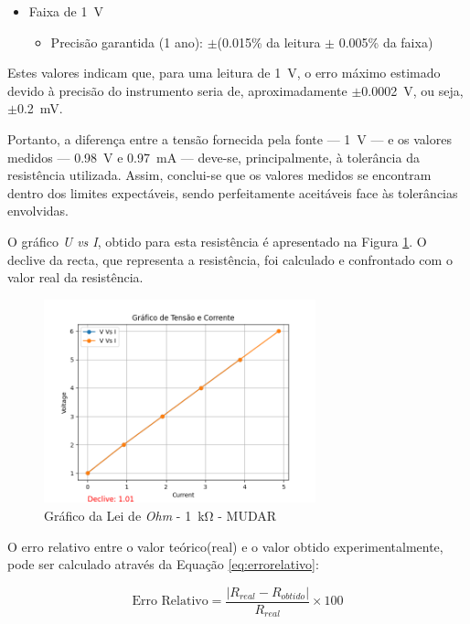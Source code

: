 \begin{itemize}
	\item Faixa de \SI{1}{\volt}
	\begin{itemize}
		\item Precisão garantida (1 ano): $\pm$(0.015\% da leitura $\pm$ 0.005\% da faixa)
	\end{itemize}
\end{itemize}

Estes valores indicam que, para uma leitura de \SI{1}{\volt}, o erro máximo estimado devido à precisão do instrumento seria de, aproximadamente $\pm$\SI{0.0002}{\volt}, ou seja, $\pm$\SI{0.2}{\milli\volt}.

Portanto, a diferença entre a tensão fornecida pela fonte — \SI{1}{\volt} — e os valores medidos — \SI{0.98}{\volt} e \SI{0.97}{\milli\ampere} — deve-se, principalmente, à tolerância da resistência utilizada. Assim, conclui-se que os valores medidos se encontram dentro dos limites expectáveis, sendo perfeitamente aceitáveis face às tolerâncias envolvidas.

O gráfico \textit{U vs I}, obtido para esta resistência é apresentado na Figura \ref{fig:grafico_LaRE_1k}. O declive da recta, que representa a resistência, foi calculado e confrontado com o valor real da resistência. 

\begin{figure}[hbtp]
	\centering
	\includegraphics[width=0.7\textwidth]{figures/ohm_graph.png}
	\caption{Gráfico da Lei de \textit{Ohm} - \SI{1}{\kilo\ohm} - MUDAR}
	\label{fig:grafico_LaRE_1k}
\end{figure}

O erro relativo entre o valor teórico(real) e o valor obtido experimentalmente, pode ser calculado através da Equação \ref{eq:errorelativo}:

\begin{equation} \label{eq:errorelativo}
	\text{Erro Relativo} = \frac{|R_{real} - R_{obtido}|}{R_{real}} \times 100
\end{equation}

